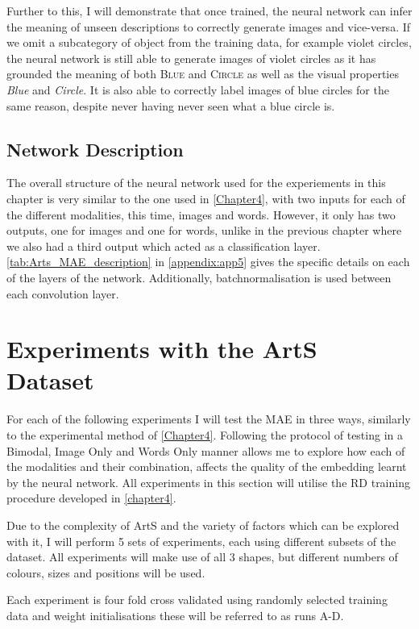 Further to this, I will demonstrate that once trained, the neural network can infer the meaning of unseen descriptions to correctly generate images and vice-versa. If we omit a subcategory of object from the training data, for example violet circles, the neural network is still able to generate images of violet circles as it has grounded the meaning of both \textsc{Blue} and \textsc{Circle} as well as the visual properties \textit{Blue} and \textit{Circle}. It is also able to correctly label images of blue circles for the same reason, despite never having never seen what a blue circle is.


\subsection{Network Description}
The overall structure of the neural network used for the experiements in this chapter is very similar to the one used in \autoref{Chapter4}, with two inputs for each of the different modalities, this time, images and words. However, it only has two outputs, one for images and one for words, unlike in the previous chapter where we also had a third output which acted as a classification layer. \autoref{tab:Arts_MAE_description} in \autoref{appendix:app5} gives the specific details on each of the layers of the network. Additionally, batchnormalisation is used between each convolution layer.



\section{Experiments with the ArtS Dataset}
For each of the following experiments I will test the MAE in three ways, similarly to the experimental method of \autoref{Chapter4}. Following the protocol of testing in a Bimodal, Image Only and Words Only manner allows me to explore how each of the modalities and their combination, affects the quality of the embedding learnt by the neural network. All experiments in this section will utilise the RD training procedure developed in \autoref{chapter4}.


Due to the complexity of ArtS and the variety of factors which can be explored with it, I will perform 5 sets of experiments, each using different subsets of the dataset. All experiments will make use of all 3 shapes, but different numbers of colours, sizes and positions will be used.

Each experiment is four fold cross validated using randomly selected training data and weight initialisations these will be referred to as runs A-D.


